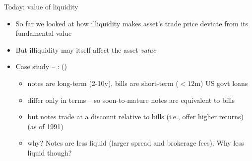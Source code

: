 \documentclass[english,10pt
,aspectratio=169
]{beamer}
\begin{document}
\begin{frame}{Today: value of liquidity}
	\begin{itemize}
		\item So far we looked at how illiquidity makes asset's trade price deviate from its fundamental value
		\item But illiquidity may itself affect the asset \emph{value}
		\item Case study -- : (\cite{amihud_liquidity_1991})
		\begin{itemize}
			\item notes are long-term (2-10y), bills are short-term ($<12$m) US govt loans
			\item differ only in terms -- so soon-to-mature notes are equivalent to bills
			\item but notes trade at a discount relative to bills (i.e., offer higher returns) (as of 1991)
			\item why? Notes are less liquid (larger spread and brokerage fees). Why less liquid though?
		\end{itemize}
	\end{itemize}
\end{frame}
\end{document}
